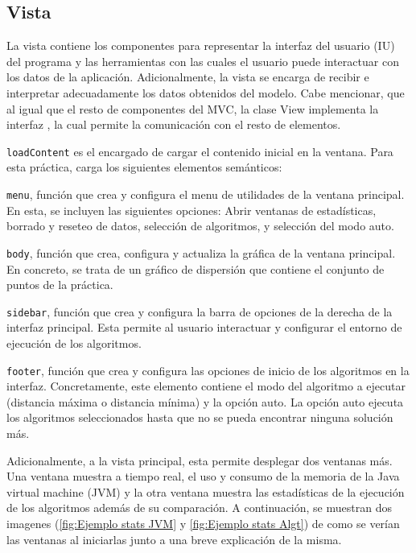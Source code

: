 \subsection{Vista}

La vista contiene los componentes para representar la interfaz del usuario (IU) del programa y las herramientas con las cuales el usuario puede interactuar con los datos de la aplicación. Adicionalmente, la vista se encarga de recibir e interpretar adecuadamente los datos obtenidos del modelo. Cabe mencionar, que al igual que el resto de componentes del MVC, la clase View implementa la interfaz , la cual permite la comunicación con el resto de elementos.\bigskip

\texttt{loadContent} es el encargado de cargar el contenido inicial en la ventana. Para esta práctica, carga los siguientes elementos semánticos:\bigskip

\texttt{menu}, función que crea y configura el menu de utilidades de la ventana principal. En esta, se incluyen las siguientes opciones: Abrir ventanas de estadísticas, borrado y reseteo de datos, selección de algoritmos, y selección del modo auto.\bigskip

\texttt{body}, función que crea, configura y actualiza la gráfica de la ventana principal. En concreto, se trata de un gráfico de dispersión que contiene el conjunto de puntos de la práctica.\bigskip

\texttt{sidebar}, función que crea y configura la barra de opciones de la derecha de la interfaz principal. Esta permite al usuario interactuar y configurar el entorno de ejecución de los algoritmos.\bigskip

\texttt{footer}, función que crea y configura las opciones de inicio de los algoritmos en la interfaz. Concretamente, este elemento contiene el modo del algoritmo a ejecutar (distancia máxima o distancia mínima) y la opción auto. La opción auto ejecuta los algoritmos seleccionados hasta que no se pueda encontrar ninguna solución más.\bigskip

Adicionalmente, a la vista principal, esta permite desplegar dos ventanas más. Una ventana muestra a tiempo real, el uso y consumo de la memoria de la Java virtual machine (JVM) y la otra ventana muestra las estadísticas de la ejecución de los algoritmos además de su comparación. A continuación, se muestran dos imagenes (\ref{fig:Ejemplo stats JVM} y \ref{fig:Ejemplo stats Algt}) de como se verían las ventanas al iniciarlas junto a una breve explicación de la misma.


